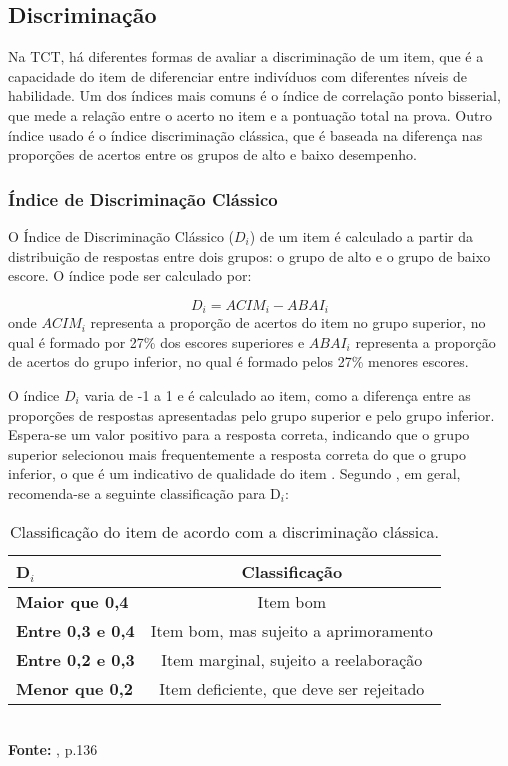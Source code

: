 \subsection{Discriminação}

Na TCT, há diferentes formas de avaliar a discriminação de um item, que é a capacidade do item de diferenciar entre indivíduos com diferentes níveis de habilidade. Um dos índices mais comuns é o índice de correlação ponto bisserial, que mede a relação entre o acerto no item e a pontuação total na prova. Outro índice usado é o índice discriminação clássica, que é baseada na diferença nas proporções de acertos entre os grupos de alto e baixo desempenho.

\subsubsection{Índice de Discriminação Clássico}

O Índice de Discriminação Clássico ($D_i$) de um item é calculado a partir da distribuição de respostas entre dois grupos: o grupo de alto e o grupo de baixo escore.
O índice pode ser calculado por: 

\[D_i =  ACIM_i - ABAI_i\] onde $ACIM_i$ representa a proporção de acertos do item no grupo superior, no qual é formado por 27\% dos escores superiores e $ABAI_i$   representa a proporção de acertos do grupo inferior, no qual é formado pelos 27\% menores escores. 

 O índice $D_i$ varia de -1 a 1 e é calculado ao item, como a diferença entre as proporções de respostas apresentadas pelo grupo superior e pelo grupo inferior. Espera-se um valor positivo para a resposta correta, indicando que o grupo superior selecionou mais frequentemente a resposta correta do que o grupo inferior, o que é um indicativo de qualidade do item  \cite{de1983consideraccoes}. Segundo , em geral, recomenda-se a seguinte classificação para D$_i$:

\begin{table}[!htb]
	\centering
		\caption{Classificação do item de acordo com a discriminação clássica.}
		\label{class-disc-classica}
		\begin{tabular}{lc}
			\hline
		\textbf{D$_i$}  &	\textbf{Classificação}    \\ 
			\hline
		\textbf{Maior que 0,4 }&  Item bom    \\ 
			\hline
			\textbf{Entre 0,3 e 0,4 }&  Item bom, mas sujeito a aprimoramento  \\ 
			\hline
			\textbf{Entre 0,2 e 0,3} & Item marginal, sujeito a reelaboração  \\ 
			\hline
		\textbf{Menor que 0,2} & Item deficiente, que deve ser rejeitado   \\ 
			\hline
		\end{tabular}\\
				\vspace*{0.5cm}
		\small{\textbf{Fonte:} , p.136}
\end{table}


